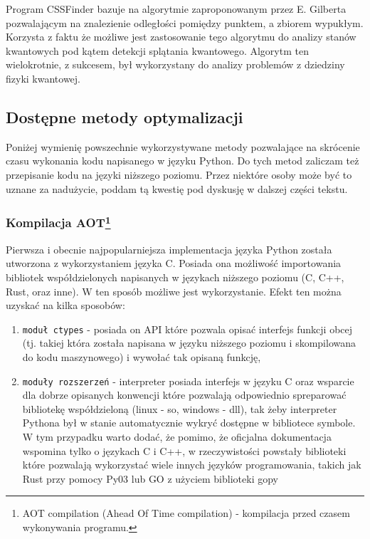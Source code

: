 \documentclass[12pt, a4paper]{article}
\newcommand{\code}[1]{\texttt{#1}}
\begin{document}
\begin{sloppypar}
    Program CSSFinder bazuje na algorytmie zaproponowanym przez E. Gilberta\cite{Lindemann_Gilbert}
    pozwalającym na znalezienie odległości pomiędzy punktem, a zbiorem wypukłym. Korzysta
    z faktu że możliwe jest zastosowanie tego algorytmu do analizy stanów kwantowych pod
    kątem detekcji splątania kwantowego\cite{MW_Hilbert_Schmidt_distance}\cite{MW_Gilbert_Quantum_Entanglement}.
    Algorytm ten wielokrotnie, z sukcesem, był wykorzystany do analizy problemów z
    dziedziny fizyki kwantowej\cite{MW_56_Year_Algorithm}\cite{MW_Variational_approach}.

    \subsection{Dostępne metody optymalizacji}


    Poniżej wymienię powszechnie wykorzystywane metody pozwalające na skrócenie czasu
    wykonania kodu napisanego w języku Python. Do tych metod zaliczam też przepisanie kodu
    na języki niższego poziomu. Przez niektóre osoby może być to uznane za nadużycie, poddam
    tą kwestię pod dyskusję w dalszej części tekstu.

    \subsubsection{Kompilacja AOT\protect\footnote{AOT compilation (Ahead Of Time compilation) - kompilacja przed czasem wykonywania programu.}}


    Pierwsza i obecnie najpopularniejsza implementacja języka Python została utworzona z
    wykorzystaniem języka C. Posiada ona możliwość importowania bibliotek
    współdzielonych napisanych w językach niższego poziomu (C, C++, Rust, oraz inne). W
    ten sposób możliwe jest wykorzystanie. Efekt ten można uzyskać na kilka sposobów:
    \begin{enumerate}
      \item \code{moduł ctypes}\cite{Python_ctypes} - posiada on API które pozwala opisać
        interfejs funkcji obcej (tj. takiej która została napisana w języku niższego poziomu
        i skompilowana do kodu maszynowego) i wywołać tak opisaną funkcję,

      \item \code{moduły rozszerzeń}\cite{Extending_Python_With_C_Cpp} - interpreter posiada
        interfejs w języku C oraz wsparcie dla dobrze opisanych konwencji które pozwalają
        odpowiednio spreparować bibliotekę współdzieloną (linux - so, windows - dll), tak
        żeby interpreter Pythona był w stanie automatycznie wykryć dostępne w bibliotece
        symbole. W tym przypadku warto dodać, że pomimo, że oficjalna dokumentacja
        wspomina tylko o językach C i C++, w rzeczywistości powstały biblioteki które pozwalają
        wykorzystać wiele innych języków programowania, takich jak Rust przy pomocy Py03\cite{PyO3}
        lub GO z użyciem biblioteki gopy\cite{gopy}


\end{enumerate}
\end{sloppypar}
\end{document}
